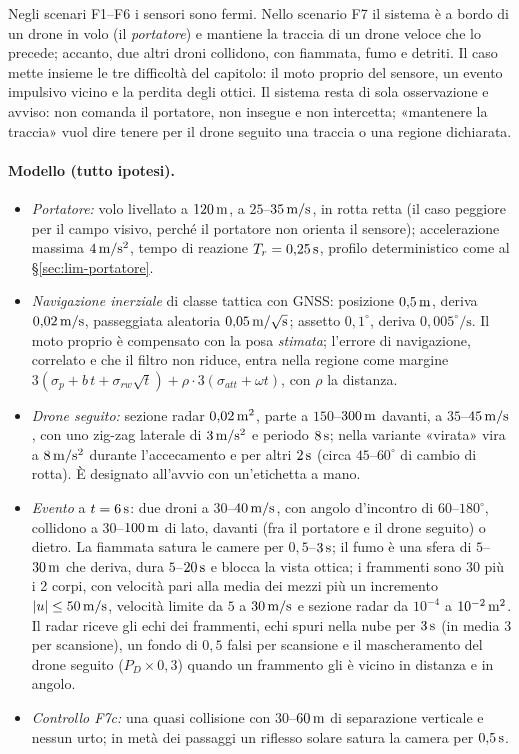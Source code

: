 Negli scenari F1--F6 i sensori sono fermi. Nello scenario F7 il sistema è a bordo di un drone in volo (il \emph{portatore}) e mantiene la traccia di un drone veloce che lo precede; accanto, due altri droni collidono, con fiammata, fumo e detriti. Il caso mette insieme le tre difficoltà del capitolo: il moto proprio del sensore, un evento impulsivo vicino e la perdita degli ottici. Il sistema resta di sola osservazione e avviso: non comanda il portatore, non insegue e non intercetta; «mantenere la traccia» vuol dire tenere per il drone seguito una traccia o una regione dichiarata.

\paragraph{Modello (tutto ipotesi).}
\begin{itemize}
\item \emph{Portatore:} volo livellato a $120\,\mathrm{m}$, a $25$--$35\,\mathrm{m/s}$, in rotta retta (il caso peggiore per il campo visivo, perché il portatore non orienta il sensore); accelerazione massima $4\,\mathrm{m/s^2}$, tempo di reazione $T_r=0{,}25\,\mathrm{s}$, profilo deterministico come al \S\ref{sec:lim-portatore}.
\item \emph{Navigazione inerziale} di classe tattica con GNSS: posizione $0{,}5\,\mathrm{m}$, deriva $0{,}02\,\mathrm{m/s}$, passeggiata aleatoria $0{,}05\,\mathrm{m/\sqrt{s}}$; assetto $0{,}1^\circ$, deriva $0{,}005^\circ/\mathrm{s}$. Il moto proprio è compensato con la posa \emph{stimata}; l'errore di navigazione, correlato e che il filtro non riduce, entra nella regione come margine $3(\sigma_p+b\,t+\sigma_{rw}\sqrt t)+\rho\cdot3(\sigma_{att}+\omega t)$, con $\rho$ la distanza.
\item \emph{Drone seguito:} sezione radar $0{,}02\,\mathrm{m^2}$, parte a $150$--$300\,\mathrm{m}$ davanti, a $35$--$45\,\mathrm{m/s}$, con uno zig-zag laterale di $3\,\mathrm{m/s^2}$ e periodo $8\,\mathrm{s}$; nella variante «virata» vira a $8\,\mathrm{m/s^2}$ durante l'accecamento e per altri $2\,\mathrm{s}$ (circa $45$--$60^\circ$ di cambio di rotta). È designato all'avvio con un'etichetta a mano.
\item \emph{Evento} a $t=6\,\mathrm{s}$: due droni a $30$--$40\,\mathrm{m/s}$, con angolo d'incontro di $60$--$180^\circ$, collidono a $30$--$100\,\mathrm{m}$ di lato, davanti (fra il portatore e il drone seguito) o dietro. La fiammata satura le camere per $0{,}5$--$3\,\mathrm{s}$; il fumo è una sfera di $5$--$30\,\mathrm{m}$ che deriva, dura $5$--$20\,\mathrm{s}$ e blocca la vista ottica; i frammenti sono 30 più i 2 corpi, con velocità pari alla media dei mezzi più un incremento $|u|\le50\,\mathrm{m/s}$, velocità limite da $5$ a $30\,\mathrm{m/s}$ e sezione radar da $10^{-4}$ a $10^{-2}\,\mathrm{m^2}$. Il radar riceve gli echi dei frammenti, echi spuri nella nube per $3\,\mathrm{s}$ (in media 3 per scansione), un fondo di $0{,}5$ falsi per scansione e il mascheramento del drone seguito ($P_D\times0{,}3$) quando un frammento gli è vicino in distanza e in angolo.
\item \emph{Controllo F7c:} una quasi collisione con $30$--$60\,\mathrm{m}$ di separazione verticale e nessun urto; in metà dei passaggi un riflesso solare satura la camera per $0{,}5\,\mathrm{s}$.
\end{itemize}

